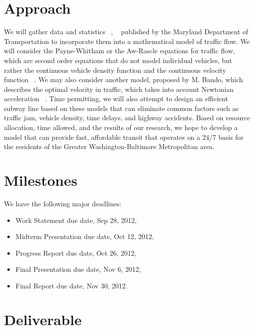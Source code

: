 \documentclass[12pt,letterpaper]{article}
\theoremstyle{definition}
\begin{document}
\section{Approach}
We will gather data and statistics ~\cite{Mobility}, ~\cite{Trends} published by the Maryland Department of Transportation to incorporate them into a mathematical model of traffic flow. We will consider the Payne-Whitham or the Aw-Rascle equations for traffic flow, which are second order equations that do not model individual vehicles, but rather the continuous vehicle density function and the continuous velocity function ~\cite{MITModel}. We may also consider another model, proposed by M. Bando, which describes the optimal velocity in traffic, which takes into account Newtonian acceleration ~\cite{BandoModel}. Time permitting, we will also attempt to design an efficient subway line based on these models that can eliminate common factors such as traffic jam, vehicle density, time delays, and highway accidents. Based on resource allocation, time allowed, and the results of our research, we hope to develop a model that can provide fast, affordable transit that operates on a 24/7 basis for the residents of the Greater Washington-Baltimore Metropolitan area.
\section{Milestones}
We have the following major deadlines:
\begin{itemize}
    \item Work Statement due date, Sep 28, 2012,
    \item Midterm Presentation due date, Oct 12, 2012,
    \item Progress Report due date, Oct 26, 2012,
    \item Final Presentation due date, Nov 6, 2012,
    \item Final Report due date, Nov 30, 2012.
\end{itemize}

\section{Deliverable}
\end{document}

